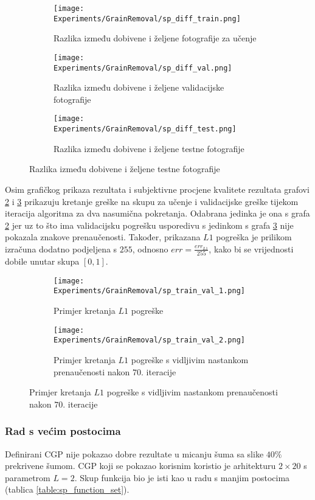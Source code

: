 \begin{figure}
\begin{subfigure}[t]{0.32\textwidth}
		\texttt{[image: Experiments/GrainRemoval/sp\_diff\_train.png]}
		\caption{Razlika između dobivene i željene fotografije za učenje}
	\end{subfigure}
	\begin{subfigure}[t]{0.32\textwidth}
		\texttt{[image: Experiments/GrainRemoval/sp\_diff\_val.png]}
		\caption{Razlika između dobivene i željene validacijske fotografije}
	\end{subfigure}
	\begin{subfigure}[t]{0.32\textwidth}
		\texttt{[image: Experiments/GrainRemoval/sp\_diff\_test.png]}
		\caption{Razlika između dobivene i željene testne fotografije}
	\end{subfigure}
	\label{fig:sp_result_grid}
\end{figure}

Osim grafičkog prikaza rezultata i subjektivne procjene kvalitete rezultata grafovi \ref{fig:sp_train_val_graph_1} i \ref{fig:sp_train_val_graph_2} prikazuju kretanje greške na skupu za učenje i validacijske greške tijekom iteracija algoritma za dva nasumična pokretanja.
Odabrana jedinka je ona s grafa \ref{fig:sp_train_val_graph_1} jer uz to što ima validacijsku pogrešku usporedivu s jedinkom s grafa \ref{fig:sp_train_val_graph_2} nije pokazala znakove prenaučenosti.
Također, prikazana $L1$ pogreška je prilikom izračuna dodatno podjeljena s $255$, odnosno $err = \frac{err_{L1}}{255}$, kako bi se vrijednosti dobile unutar skupa $[0, 1]$.

\begin{figure}
	\centering
	\caption{Grafovi kretanja $L1$ pogreške kroz iteracije algoritma}
	\begin{subfigure}[t]{0.48\textwidth}
		\texttt{[image: Experiments/GrainRemoval/sp\_train\_val\_1.png]}
		\caption{Primjer kretanja $L1$ pogreške}
		\label{fig:sp_train_val_graph_1}
	\end{subfigure}
	\begin{subfigure}[t]{0.48\textwidth}
		\texttt{[image: Experiments/GrainRemoval/sp\_train\_val\_2.png]}
		\caption{Primjer kretanja $L1$ pogreške s vidljivim nastankom prenaučenosti nakon $70.$ iteracije}
		\label{fig:sp_train_val_graph_2}
	\end{subfigure}
	\label{fig:sp_train_val_graph}
\end{figure}

\subsubsection{Rad s većim postocima}
Definirani CGP nije pokazao dobre rezultate u micanju šuma sa slike $40\%$ prekrivene šumom.
CGP koji se pokazao korisnim koristio je arhitekturu $2 \times 20$ s parametrom $L = 2$.
Skup funkcija bio je isti kao u radu s manjim postocima (tablica \ref{table:sp_function_set}).

